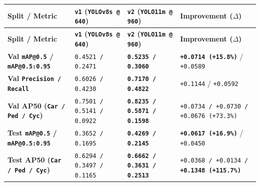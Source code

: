\documentclass[10.5pt,a4paper]{article}
\begin{document}
\begin{footnotesize}
\setlength{\tabcolsep}{4pt}
\setlength{\LTleft}{0pt}\setlength{\LTright}{0pt}
\begin{longtable}{>{\raggedright\arraybackslash}p{} >{\raggedright\arraybackslash}p{} >{\raggedright\arraybackslash}p{} >{\raggedright\arraybackslash}p{}}
\toprule
\textbf{Split / Metric} & \textbf{\texttt{v1} (\texttt{YOLOv8s @ 640})} & \textbf{\texttt{v2} (\texttt{YOLO11m @ 960})} & \textbf{Improvement (\texttt{$\Delta$})} \\
\midrule
\endfirsthead
\toprule
\textbf{Split / Metric} & \textbf{\texttt{v1} (\texttt{YOLOv8s @ 640})} & \textbf{\texttt{v2} (\texttt{YOLO11m @ 960})} & \textbf{Improvement (\texttt{$\Delta$})} \\
\midrule
\endhead
\bottomrule
\endfoot
\textbf{Val \texttt{mAP@0.\allowbreak{}5} / \texttt{mAP@0.\allowbreak{}5:\allowbreak{}0.\allowbreak{}95}} & \texttt{0.\allowbreak{}4521 /\allowbreak{} 0.\allowbreak{}2471} & \textbf{\texttt{0.\allowbreak{}5235 /\allowbreak{} 0.\allowbreak{}3060}} & \textbf{\texttt{+0.\allowbreak{}0714 (+15.\allowbreak{}8\%)}} / \texttt{+0.\allowbreak{}0589} \\
\textbf{Val \texttt{Precision /\allowbreak{} Recall}} & \texttt{0.\allowbreak{}6026 /\allowbreak{} 0.\allowbreak{}4230} & \textbf{\texttt{0.\allowbreak{}7170 /\allowbreak{} 0.\allowbreak{}4822}} & \texttt{+0.\allowbreak{}1144} / \texttt{+0.\allowbreak{}0592} \\
\textbf{Val AP50 (\texttt{Car /\allowbreak{} Ped /\allowbreak{} Cyc})} & \texttt{0.\allowbreak{}7501 /\allowbreak{} 0.\allowbreak{}5141 /\allowbreak{} 0.\allowbreak{}0922} & \textbf{\texttt{0.\allowbreak{}8235 /\allowbreak{} 0.\allowbreak{}5871 /\allowbreak{} 0.\allowbreak{}1598}} & \texttt{+0.\allowbreak{}0734 /\allowbreak{} +0.\allowbreak{}0730 /\allowbreak{} +0.\allowbreak{}0676 (+73.\allowbreak{}3\%)} \\
\textbf{Test \texttt{mAP@0.\allowbreak{}5} / \texttt{mAP@0.\allowbreak{}5:\allowbreak{}0.\allowbreak{}95}} & \texttt{0.\allowbreak{}3652 /\allowbreak{} 0.\allowbreak{}1695} & \textbf{\texttt{0.\allowbreak{}4269 /\allowbreak{} 0.\allowbreak{}2145}} & \textbf{\texttt{+0.\allowbreak{}0617 (+16.\allowbreak{}9\%)}} / \texttt{+0.\allowbreak{}0450} \\
\textbf{Test AP50 (\texttt{Car /\allowbreak{} Ped /\allowbreak{} Cyc})} & \texttt{0.\allowbreak{}6294 /\allowbreak{} 0.\allowbreak{}3497 /\allowbreak{} 0.\allowbreak{}1165} & \textbf{\texttt{0.\allowbreak{}6662 /\allowbreak{} 0.\allowbreak{}3631 /\allowbreak{} 0.\allowbreak{}2513}} & \texttt{+0.\allowbreak{}0368 /\allowbreak{} +0.\allowbreak{}0134 /\allowbreak{}} \textbf{\texttt{+0.\allowbreak{}1348 (+115.\allowbreak{}7\%)}} \\
\end{longtable}
\end{footnotesize}
\end{document}
